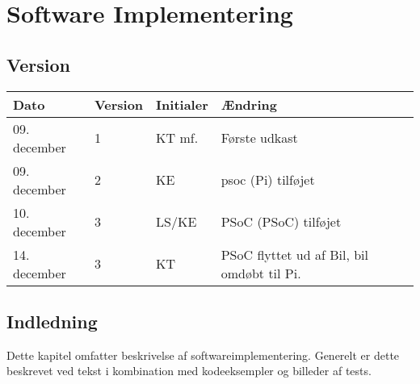 \chapter{Software Implementering}\label{ch:sw_impl}
\section*{Version}
\begin{table}[h]
	\centering
	\begin{tabularx}{\textwidth - 2cm}{|l|l|l|X|}
	\hline
	Dato			& Version			& Initialer 		& Ændring				\\ \hline
	09. december	& 1 				& KT mf.	 		& Første udkast			\\ \hline
	09. december	& 2 				& KE		 		& psoc (Pi) tilføjet	\\ \hline
	10. december	& 3 				& LS/KE		 		& PSoC (PSoC) tilføjet	\\ \hline
	14. december	& 3 				& KT		 		& PSoC flyttet ud af Bil, bil omdøbt til Pi.	\\\hline
	\end{tabularx}
\end{table}

\section*{Indledning}

Dette kapitel omfatter beskrivelse af softwareimplementering.
Generelt er dette beskrevet ved tekst i kombination med kodeeksempler og billeder af tests.

\clearpage


\clearpage

\clearpage
